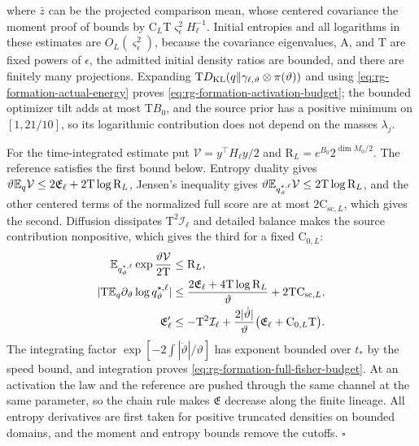 where \(\bar z\) can be the projected comparison mean, whose centered
covariance the moment proof of 
bounds by \(\mathrm C_L\mathrm T\varsigma_\epsilon^2H_\ell^{-1}\). Initial
entropies and all logarithms in these estimates are
\(O_L(\varsigma_\epsilon^2)\), because the covariance eigenvalues, \(\mathrm A\),
and \(\mathrm T\) are fixed powers of \(\epsilon\), the admitted initial density
ratios are bounded, and there are finitely many projections. Expanding
\(\mathrm TD_{\mathrm{KL}}(q\Vert\gamma_{\ell,\vartheta}\otimes\pi(\vartheta))\) and using
\cref{eq:rg-formation-actual-energy} proves
\cref{eq:rg-formation-activation-budget}; the bounded optimizer tilt adds at
most \(\mathrm TB_0\), and the source prior has a positive minimum on
\([1,21/10]\), so its logarithmic contribution does not depend on the masses
\(\lambda_j\).

For the time-integrated estimate put \(\mathcal V=y^\top H_\ell y/2\) and
\(\mathrm R_L=e^{B_0}2^{\dim M_0/2}\). The reference satisfies the first bound
below. Entropy duality gives
\(\vartheta\mathbb E_q\mathcal V\le2\mathfrak E_\ell+2\mathrm T\log\mathrm R_L\),
Jensen's inequality gives
\(\vartheta\mathbb E_{q^{\star,\ell}_\vartheta}\mathcal V\le2\mathrm T\log\mathrm R_L\),
and the other centered terms of the normalized full score are at most
\(2\mathrm C_{\mathrm{sc},L}\), which gives the second. Diffusion dissipates
\(\mathrm T^2\mathcal I_\ell\) and detailed balance makes the source
contribution nonpositive, which gives the third for a fixed
\(\mathrm C_{0,L}\):
\begin{align}
 \mathbb E_{q^{\star,\ell}_\vartheta}\exp\frac{\vartheta\mathcal V}{2\mathrm T}
 &\le \mathrm R_L,
 \label{eq:rg-formation-energy-exponential-moment}\\
 |\mathrm T\mathbb E_q\partial_\vartheta\log q^{\star,\ell}_\vartheta|
 &\le\frac{2\mathfrak E_\ell+4\mathrm T\log\mathrm R_L}{\vartheta}+2\mathrm T\mathrm C_{\mathrm{sc},L},
 \label{eq:rg-formation-entropy-parameter-budget}\\
 \mathfrak E_\ell'&\le -\mathrm T^2\mathcal I_\ell+
    \frac{2|\dot\vartheta|}{\vartheta}\bigl(\mathfrak E_\ell+\mathrm C_{0,L}\mathrm T\bigr).
 \label{eq:rg-formation-entropy-energy-inequality}
\end{align}
The integrating factor \(\exp[-2\int|\dot\vartheta|/\vartheta]\) has exponent
bounded over \(t_*\) by the speed bound, and integration proves
\cref{eq:rg-formation-full-fisher-budget}. At an activation the law and the
reference are pushed through the same channel at the same parameter, so the
chain rule makes \(\mathfrak E\) decrease along the finite lineage. All
entropy derivatives are first taken for positive truncated densities on
bounded domains, and the moment and entropy bounds remove the cutoffs.
\hfill\(\square\)

